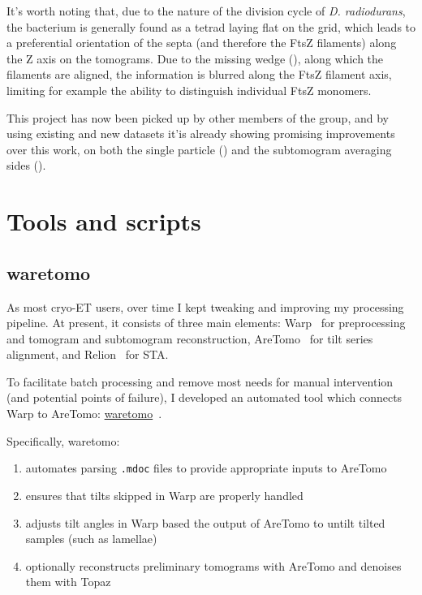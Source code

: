 It's worth noting that, due to the nature of the division cycle of \textit{D. radiodurans}, the bacterium is generally found as a tetrad laying flat on the grid, which leads to a preferential orientation of the septa (and therefore the FtsZ filaments) along the Z axis on the tomograms.
Due to the missing wedge (), along which the filaments are aligned, the information is blurred along the FtsZ filament axis, limiting for example the ability to distinguish individual FtsZ monomers.

This project has now been picked up by other members of the group, and by using existing and new datasets it'is already showing promising improvements over this work, on both the single particle () and the subtomogram averaging sides ().


\section{Tools and scripts}

\subsection{waretomo}\label{waretomo}

As most cryo-ET users, over time I kept tweaking and improving my processing pipeline.
At present, it consists of three main elements: Warp~\cite{tegunovRealtimeCryoelectronMicroscopy2019} for preprocessing and tomogram and subtomogram reconstruction, AreTomo~\cite{zhengAreTomoIntegratedSoftware2022} for tilt series alignment, and Relion~\cite{scheresRELIONImplementationBayesian2012,zivanovBayesianApproachSingleparticle2022,burtImageProcessingPipeline2024} for STA.

To facilitate batch processing and remove most needs for manual intervention (and potential points of failure), I developed an automated tool which connects Warp to AreTomo: \href{https://gihub.com/brisvag/waretomo}{waretomo}~\cite{gaifasWaretomo2024}.

Specifically, waretomo:
\begin{enumerate}[noitemsep]
    \item automates parsing \texttt{.mdoc} files to provide appropriate inputs to AreTomo
    \item ensures that tilts skipped in Warp are properly handled
    \item adjusts tilt angles in Warp based the output of AreTomo to untilt tilted samples (such as lamellae)
    \item optionally reconstructs preliminary tomograms with AreTomo and denoises them with Topaz~\cite{beplerTopazDenoiseGeneralDeep2020}
\end{enumerate}

